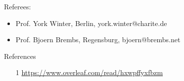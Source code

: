 






%
Referees:
\begin{itemize}[noitemsep,topsep=0pt]
\item Prof. York Winter, Berlin, york.winter@charite.de
 
\item Prof. Bjoern Brembs, Regensburg, bjoern@brembs.net
\end{itemize}

References
\begin{itemize}[noitemsep,topsep=0pt]

\item [1] \url{https://www.overleaf.com/read/hxwpffyxfbzm}



\end{itemize}
\newpage 

